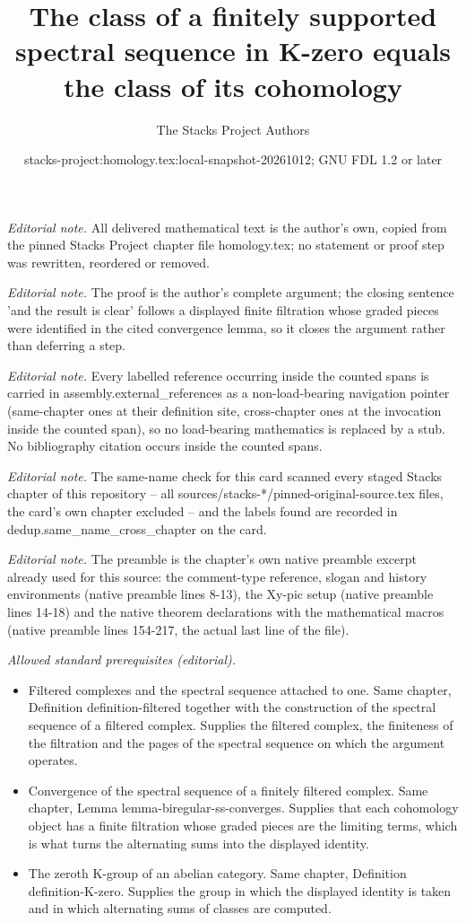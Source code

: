 \documentclass[10pt,a4paper]{amsart}
\title{The class of a finitely supported spectral sequence in K-zero equals the class of its cohomology}
\author{The Stacks Project Authors}
\date{stacks-project:homology.tex:local-snapshot-20261012; GNU FDL 1.2 or later}
\theoremstyle{plain}
\theoremstyle{definition}
\theoremstyle{remark}
\numberwithin{equation}{subsection}
\begin{document}
\maketitle
\noindent\textit{Editorial note.} All delivered mathematical text is the author's own, copied from the pinned Stacks Project chapter file homology.tex; no statement or proof step was rewritten, reordered or removed.\par\medskip
\noindent\textit{Editorial note.} The proof is the author's complete argument; the closing sentence 'and the result is clear' follows a displayed finite filtration whose graded pieces were identified in the cited convergence lemma, so it closes the argument rather than deferring a step.\par\medskip
\noindent\textit{Editorial note.} Every labelled reference occurring inside the counted spans is carried in assembly.external\_references as a non-load-bearing navigation pointer (same-chapter ones at their definition site, cross-chapter ones at the invocation inside the counted span), so no load-bearing mathematics is replaced by a stub. No bibliography citation occurs inside the counted spans.\par\medskip
\noindent\textit{Editorial note.} The same-name check for this card scanned every staged Stacks chapter of this repository -- all sources/stacks-*/pinned-original-source.tex files, the card's own chapter excluded -- and the labels found are recorded in dedup.same\_name\_cross\_chapter on the card.\par\medskip
\noindent\textit{Editorial note.} The preamble is the chapter's own native preamble excerpt already used for this source: the comment-type reference, slogan and history environments (native preamble lines 8-13), the Xy-pic setup (native preamble lines 14-18) and the native theorem declarations with the mathematical macros (native preamble lines 154-217, the actual last line of the file).\par\medskip
\noindent\textit{Allowed standard prerequisites (editorial).}\begin{itemize}
\item Filtered complexes and the spectral sequence attached to one. Same chapter, Definition definition-filtered together with the construction of the spectral sequence of a filtered complex. Supplies the filtered complex, the finiteness of the filtration and the pages of the spectral sequence on which the argument operates.
\item Convergence of the spectral sequence of a finitely filtered complex. Same chapter, Lemma lemma-biregular-ss-converges. Supplies that each cohomology object has a finite filtration whose graded pieces are the limiting terms, which is what turns the alternating sums into the displayed identity.
\item The zeroth K-group of an abelian category. Same chapter, Definition definition-K-zero. Supplies the group in which the displayed identity is taken and in which alternating sums of classes are computed.
\end{itemize}\medskip
\end{document}
